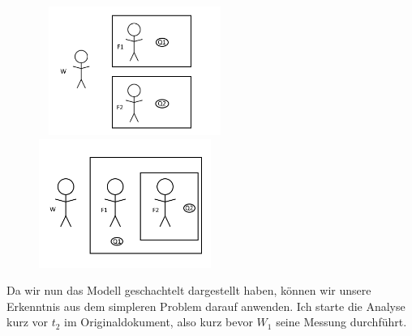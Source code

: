 \documentclass[a4paper]{article}
\begin{document}
\begin{figure}[!htb]
\begin{floatrow}[2]\
%
{\includegraphics[width=0.5\textwidth]{c.png}}
%
%
{\includegraphics[width=0.5\textwidth]{d.png}}
\end{floatrow}
\end{figure}
Da wir nun das Modell geschachtelt dargestellt haben, können wir unsere Erkenntnis aus dem simpleren Problem darauf anwenden. Ich starte die Analyse kurz vor $t_2$ im Originaldokument, also kurz bevor $W_1$ seine Messung durchführt.
\end{document}
